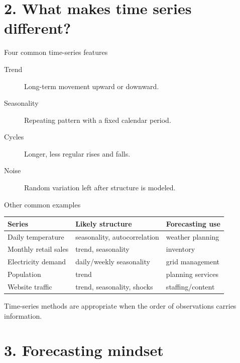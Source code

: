 \documentclass[aspectratio=169,11pt]{beamer}
\begin{document}
\section{2. What makes time series different?}

\begin{frame}{Four common time-series features}
\begin{description}
  \item[Trend] Long-term movement upward or downward.
  \item[Seasonality] Repeating pattern with a fixed calendar period.
  \item[Cycles] Longer, less regular rises and falls.
  \item[Noise] Random variation left after structure is modeled.
\end{description}

\end{frame}

\begin{frame}{Other common examples}
\begin{tabular}{lll}
\toprule
Series & Likely structure & Forecasting use \\
\midrule
Daily temperature & seasonality, autocorrelation & weather planning \\
Monthly retail sales & trend, seasonality & inventory \\
Electricity demand & daily/weekly seasonality & grid management \\
Population & trend & planning services \\
Website traffic & trend, seasonality, shocks & staffing/content \\
\bottomrule
\end{tabular}

\vspace{0.5cm}
Time-series methods are appropriate when the order of observations carries information.
\end{frame}

\section{3. Forecasting mindset}
\end{document}

